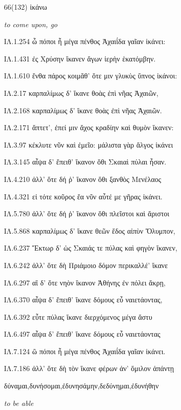 \begin{enumerate}
{}

\clearpage
\item[\large 66(132)]{\large \g ἱκάνω}

\hspace{0.2cm} \textit{ to come upon, go }

{\g
ΙΛ.1.254 ὦ πόποι ἦ μέγα πένθος Ἀχαιΐδα γαῖαν ἱκάνει: 

ΙΛ.1.431 ἐς Χρύσην ἵκανεν ἄγων ἱερὴν ἑκατόμβην. 

ΙΛ.1.610 ἔνθα πάρος κοιμᾶθ' ὅτε μιν γλυκὺς ὕπνος ἱκάνοι: 

ΙΛ.2.17 καρπαλίμως δ' ἵκανε θοὰς ἐπὶ νῆας Ἀχαιῶν, 

ΙΛ.2.168 καρπαλίμως δ' ἵκανε θοὰς ἐπὶ νῆας Ἀχαιῶν. 

ΙΛ.2.171 ἅπτετ', ἐπεί μιν ἄχος κραδίην καὶ θυμὸν ἵκανεν: 

ΙΛ.3.97 κέκλυτε νῦν καὶ ἐμεῖο: μάλιστα γὰρ ἄλγος ἱκάνει 

ΙΛ.3.145 αἶψα δ' ἔπειθ' ἵκανον ὅθι Σκαιαὶ πύλαι ἦσαν. 

ΙΛ.4.210 ἀλλ' ὅτε δή ῥ' ἵκανον ὅθι ξανθὸς Μενέλαος 

ΙΛ.4.321 εἰ τότε κοῦρος ἔα νῦν αὖτέ με γῆρας ἱκάνει. 

ΙΛ.5.780 ἀλλ' ὅτε δή ῥ' ἵκανον ὅθι πλεῖστοι καὶ ἄριστοι 

ΙΛ.5.868 καρπαλίμως δ' ἵκανε θεῶν ἕδος αἰπὺν Ὄλυμπον, 

ΙΛ.6.237 Ἕκτωρ δ' ὡς Σκαιάς τε πύλας καὶ φηγὸν ἵκανεν, 

ΙΛ.6.242 ἀλλ' ὅτε δὴ Πριάμοιο δόμον περικαλλέ' ἵκανε 

ΙΛ.6.297 αἳ δ' ὅτε νηὸν ἵκανον Ἀθήνης ἐν πόλει ἄκρῃ, 

ΙΛ.6.370 αἶψα δ' ἔπειθ' ἵκανε δόμους εὖ ναιετάοντας, 

ΙΛ.6.392 εὖτε πύλας ἵκανε διερχόμενος μέγα ἄστυ 

ΙΛ.6.497 αἶψα δ' ἔπειθ' ἵκανε δόμους εὖ ναιετάοντας 

ΙΛ.7.124 ὢ πόποι ἦ μέγα πένθος Ἀχαιΐδα γαῖαν ἱκάνει. 

ΙΛ.7.186 ἀλλ' ὅτε δὴ τὸν ἵκανε φέρων ἀν' ὅμιλον ἁπάντῃ 

}

\clearpage
\item[\large ]{\large \g δύναμαι,δυνήσομαι,ἐδυνησάμην,δεδύνημαι,ἐδυνήθην}

\hspace{0.2cm} \textit{ to be able }


\end{enumerate}
